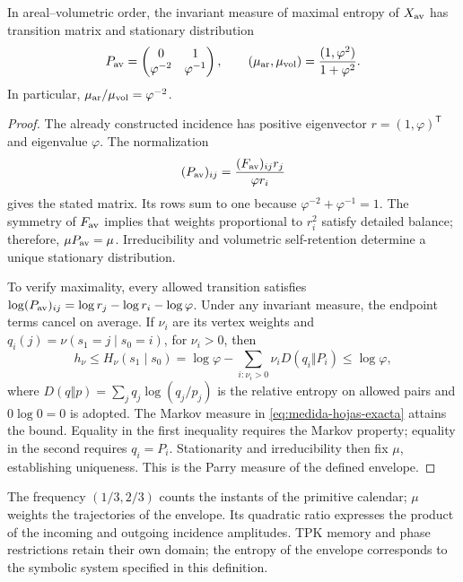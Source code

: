 \begin{proposition}
In areal--volumetric order, the invariant measure of maximal entropy
of \(X_{\rm av}\) has transition matrix and stationary distribution
\begin{equation}
 P_{\rm av}=\begin{pmatrix}0&1\\\varphi^{-2}&\varphi^{-1}\end{pmatrix},
 \qquad
 (\mu_{\rm ar},\mu_{\rm vol})
 =\frac{(1,\varphi^2)}{1+\varphi^2}.
 \label{eq:medida-hojas-exacta}
\end{equation}
In particular, \(\mu_{\rm ar}/\mu_{\rm vol}=\varphi^{-2}\).
\end{proposition}
\begin{proof}
The already constructed incidence has positive eigenvector
\(r=(1,\varphi)^{\mathsf T}\) and eigenvalue \(\varphi\). The
normalization
\[
 (P_{\rm av})_{ij}
 =\frac{(F_{\rm av})_{ij}r_j}{\varphi r_i}
\]
gives the stated matrix. Its rows sum to one because
\(\varphi^{-2}+\varphi^{-1}=1\). The symmetry of \(F_{\rm av}\)
implies that weights proportional to \(r_i^2\) satisfy detailed
balance; therefore, \(\mu P_{\rm av}=\mu\). Irreducibility and
volumetric self-retention determine a unique stationary distribution.

To verify maximality, every allowed transition satisfies
\(\log(P_{\rm av})_{ij}=\log r_j-\log r_i-\log\varphi\).
Under any invariant measure, the endpoint terms cancel
on average. If \(\nu_i\) are its vertex weights and
\(q_i(j)=\nu(s_1=j\mid s_0=i)\), for \(\nu_i>0\), then
\[
 h_\nu\leq H_\nu(s_1\mid s_0)
 =\log\varphi-\sum_{i:\nu_i>0}\nu_iD(q_i\Vert P_i)
 \leq\log\varphi,
\]
where \(D(q\Vert p)=\sum_jq_j\log(q_j/p_j)\) is the relative
entropy on allowed pairs and \(0\log0=0\) is adopted.
The Markov measure in \eqref{eq:medida-hojas-exacta} attains the bound.
Equality in the first inequality requires the Markov property;
equality in the second requires \(q_i=P_i\). Stationarity and
irreducibility then fix \(\mu\), establishing
uniqueness. This is the Parry measure of the defined envelope.
\end{proof}

The frequency \((1/3,2/3)\) counts the instants of the primitive calendar;
\(\mu\) weights the trajectories of the envelope. Its quadratic ratio
expresses the product of the incoming and outgoing incidence amplitudes.
TPK memory and phase restrictions retain their own
domain; the entropy of the envelope corresponds to the symbolic system
specified in this definition.

